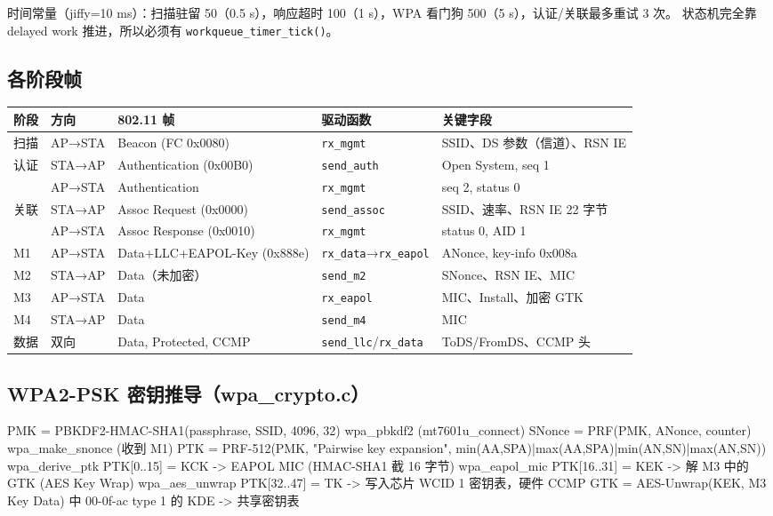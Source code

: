 \documentclass[UTF8,zihao=-4,fontset=none]{ctexart}
\newcommand{\fn}[1]{\texttt{#1}}
\begin{document}
时间常量（jiffy=10 ms）：扫描驻留 50（0.5 s），响应超时 100（1 s），WPA 看门狗 500（5 s），认证/关联最多重试 3 次。
状态机完全靠 delayed work 推进，所以必须有 \fn{workqueue\_timer\_tick()}。

\subsection{各阶段帧}

\begin{longtable}{p{10mm}p{17mm}p{40mm}p{36mm}p{38mm}}
\toprule
阶段 & 方向 & 802.11 帧 & 驱动函数 & 关键字段 \\ \midrule \endhead
扫描 & AP→STA & Beacon (FC 0x0080) & \fn{rx\_mgmt} & SSID、DS 参数（信道）、RSN IE \\
认证 & STA→AP & Authentication (0x00B0) & \fn{send\_auth} & Open System, seq 1 \\
 & AP→STA & Authentication & \fn{rx\_mgmt} & seq 2, status 0 \\
关联 & STA→AP & Assoc Request (0x0000) & \fn{send\_assoc} & SSID、速率、RSN IE 22 字节 \\
 & AP→STA & Assoc Response (0x0010) & \fn{rx\_mgmt} & status 0, AID 1 \\
M1 & AP→STA & Data+LLC+EAPOL-Key (0x888e) & \fn{rx\_data}→\fn{rx\_eapol} & ANonce, key-info 0x008a \\
M2 & STA→AP & Data（未加密） & \fn{send\_m2} & SNonce、RSN IE、MIC \\
M3 & AP→STA & Data & \fn{rx\_eapol} & MIC、Install、加密 GTK \\
M4 & STA→AP & Data & \fn{send\_m4} & MIC \\
数据 & 双向 & Data, Protected, CCMP & \fn{send\_llc}/\fn{rx\_data} & ToDS/FromDS、CCMP 头 \\
\bottomrule
\end{longtable}

\subsection{WPA2-PSK 密钥推导（wpa\_crypto.c）}

\begin{code}
PMK    = PBKDF2-HMAC-SHA1(passphrase, SSID, 4096, 32)       wpa_pbkdf2     (mt7601u_connect)
SNonce = PRF(PMK, ANonce, counter)                           wpa_make_snonce (收到 M1)
PTK    = PRF-512(PMK, "Pairwise key expansion",
                 min(AA,SPA)|max(AA,SPA)|min(AN,SN)|max(AN,SN))   wpa_derive_ptk
  PTK[0..15]  = KCK -> EAPOL MIC (HMAC-SHA1 截 16 字节)      wpa_eapol_mic
  PTK[16..31] = KEK -> 解 M3 中的 GTK (AES Key Wrap)        wpa_aes_unwrap
  PTK[32..47] = TK  -> 写入芯片 WCID 1 密钥表，硬件 CCMP
GTK    = AES-Unwrap(KEK, M3 Key Data) 中 00-0f-ac type 1 的 KDE -> 共享密钥表
\end{code}
\end{document}
